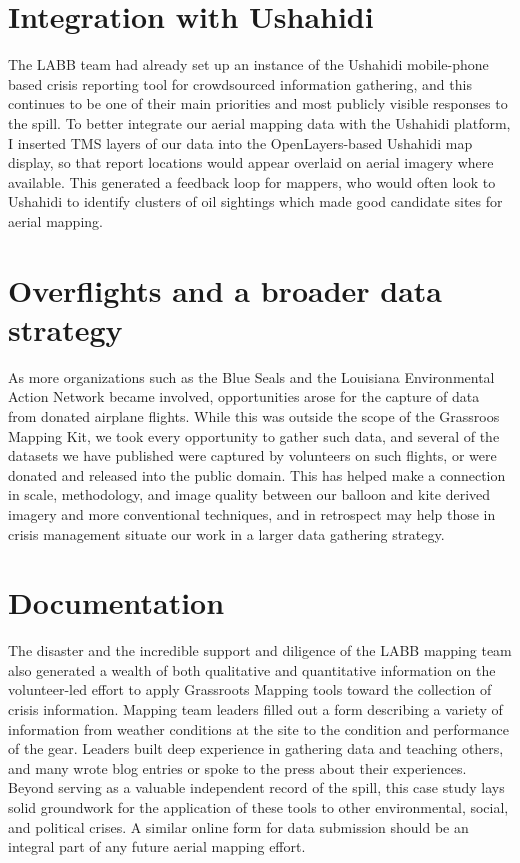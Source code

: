 \documentclass[11pt,oneside,notitlepage]{report}
\begin{document}
\section{Integration with Ushahidi}

The \ac{LABB} team had already set up an instance of the Ushahidi mobile-phone based crisis reporting tool for crowdsourced information gathering, and this continues to be one of their main priorities and most publicly visible responses to the spill. To better integrate our aerial mapping data with the Ushahidi platform, I inserted \ac{TMS} layers of our data into the OpenLayers-based Ushahidi map display, so that report locations would appear overlaid on aerial imagery where available. This generated a feedback loop for mappers, who would often look to Ushahidi to identify clusters of oil sightings which made good candidate sites for aerial mapping.

\section{Overflights and a broader data strategy}

As more organizations such as the Blue Seals and the Louisiana Environmental Action Network became involved, opportunities arose for the capture of data from donated airplane flights. While this was outside the scope of the Grassroos Mapping Kit, we took every opportunity to gather such data, and several of the datasets we have published were captured by volunteers on such flights, or were donated and released into the public domain. This has helped make a connection in scale, methodology, and image quality between our balloon and kite derived imagery and more conventional techniques, and in retrospect may help those in crisis management situate our work in a larger data gathering strategy. 

\section{Documentation}

The disaster and the incredible support and diligence of the LABB mapping team also generated a wealth of both qualitative and quantitative information on the volunteer-led effort to apply Grassroots Mapping tools toward the collection of crisis information. Mapping team leaders filled out a form describing a variety of information from weather conditions at the site to the condition and performance of the gear. Leaders built deep experience in gathering data and teaching others, and many wrote blog entries or spoke to the press about their experiences. Beyond serving as a valuable independent record of the spill, this case study lays solid groundwork for the application of these tools to other environmental, social, and political crises. A similar online form for data submission should be an integral part of any future aerial mapping effort.
\end{document}
